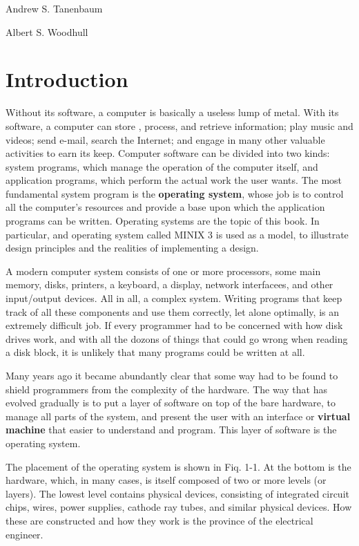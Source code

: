 \documentclass{book}
\newcommand {\kw}  [1] {\textbf{#1}}
\begin{document}
Andrew S. Tanenbaum

Albert S. Woodhull


\chapter{Introduction}
Without its software, a computer is basically a useless lump of metal.
With its software, a computer can store , process, and retrieve information; 
play music and videos; send e-mail, search the Internet; and engage in many other valuable activities to earn its keep.
Computer software can be divided into two kinds: system programs, which manage the operation of the computer itself, 
and application programs, which perform the actual work the user wants.
The most fundamental system program is the \kw{operating system}, whose job is to control all the computer's resources and 
provide a base upon which the application programs can be written.
Operating systems are the topic of this book.
In particular, and operating system called MINIX 3 is used as a model, to illustrate design principles and the realities of implementing a design.

A modern computer system consists of one or more processors, some main memory, disks, 
printers, a keyboard, a display, network interfacees, and other input/output devices. 
All in all, a complex system.
Writing programs that keep track of all these components and use them correctly, let alone optimally, is an extremely difficult job.
If every programmer had to be concerned with how disk drives work, and with all the dozons of things that could go wrong when reading a disk block, 
it is unlikely that many programs could be written at all.

Many years ago it became abundantly clear that some way had to be found to shield programmers from the complexity of the hardware.
The way that has evolved gradually is to put a layer of software on top of the bare hardware, 
to manage all parts of the system, and present the user with an interface or \kw{virtual machine} that easier to understand and program.
This layer of software is the operating system.

The placement of the operating system is shown in Fiq. 1-1.
At the bottom is the hardware, which, in many cases, is itself composed of two or more levels (or layers).
The lowest level contains physical devices, consisting of integrated circuit chips, wires, power supplies, cathode ray tubes, and similar physical devices.
How these are constructed and how they work is the province of the electrical engineer.
\end{document}
